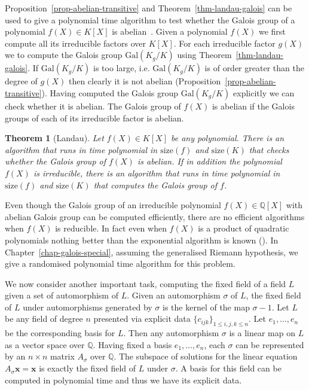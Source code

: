\documentclass[11pt]{madras}%
\newtheorem{theorem}{Theorem}[chapter]
\theoremstyle{remark}
\newcommand{\Gal}[1]{{\ensuremath{\mathrm{Gal}\left(#1\right)}}}
\newcommand{\size}[1]{{\ensuremath{\mathrm{size}\left(#1\right)}}}
\begin{document}
Proposition~\ref{prop-abelian-transitive} and
Theorem~\ref{thm-landau-galois} can be used to give a polynomial time
algorithm to test whether the Galois group of a polynomial $f(X) \in
K[X]$ is abelian~\cite{landau84galois}. Given a polynomial $f(X)$ we
first compute all its irreducible factors over $K[X]$. For each
irreducible factor $g(X)$ we to compute the Galois group $\Gal{K_g/K}$
using Theorem~\ref{thm-landau-galois}. If $\Gal{K_g/K}$ is too large,
i.e.  $\Gal{K_g/K}$ is of order greater than the degree of $g(X)$ then
clearly it is not abelian (Proposition~\ref{prop-abelian-transitive}).
Having computed the Galois group $\Gal{K_g/K}$ explicitly we can check
whether it is abelian. The Galois group of $f(X)$ is abelian if the
Galois groups of each of its irreducible factor is abelian.

\begin{theorem}[Landau]\label{thm-landau-abelian-galois}
  Let $f(X) \in K[X]$ be any polynomial. There is an algorithm that
  runs in time polynomial in $\size{f}$ and $\size{K}$ that checks
  whether the Galois group of $f(X)$ is abelian. If in addition the
  polynomial $f(X)$ is irreducible, there is an algorithm that runs in
  time polynomial in $\size{f}$ and $\size{K}$ that computes the
  Galois group of $f$.
\end{theorem}


Even though the Galois group of an irreducible polynomial $f(X) \in
\mathbb{Q}[X]$ with abelian Galois group can be computed efficiently,
there are no efficient algorithms when $f(X)$ is reducible.  In fact
even when $f(X)$ is a product of quadratic polynomials nothing better
than the exponential algorithm is known (\cite[Problem
3.4]{lenstra92algorithm}). In Chapter~\ref{chap-galois-special},
assuming the generalised Riemann hypothesis, we give a randomised
polynomial time algorithm for this problem.

We now consider another important task, computing the fixed field of a
field $L$ given a set of automorphism of $L$. Given an automorphism
$\sigma$ of $L$, the fixed field of $L$ under automorphisms generated
by $\sigma$ is the kernel of the map $\sigma - 1$.  Let $L$ be any
field of degree $n$ presented via explicit data $\{ c_{ijk}\}_{1 \leq
  i,j,k \leq n}$.  Let $e_1,\ldots,e_n$ be the corresponding basis for
$L$.  Then any automorphism $\sigma$ is a linear map on $L$ as a
vector space over $\mathbb{Q}$. Having fixed a basis $e_1,\ldots,e_n$,
each $\sigma$ can be represented by an $n\times n$ matrix $A_\sigma$
over $\mathbb{Q}$.  The subspace of solutions for the linear equation
$A_\sigma \mathbf{x} = \mathbf{x}$ is exactly the fixed field of $L$
under $\sigma$.  A basis for this field can be computed in polynomial
time and thus we have its explicit data.
\end{document}
